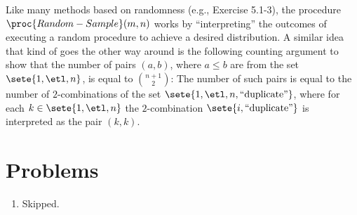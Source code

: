 \begin{enumerate}[\thesection-1]
\begin{remark}
Like many methods based on randomness (e.g., Exercise 5.1-3), the procedure $\proc{Random-Sample}(m, n)$ works by ``interpreting'' the outcomes of executing a random procedure to achieve a desired distribution. A similar idea that kind of goes the other way around is the following counting argument to show that the number of pairs $(a, b)$, where $a \leq b$ are from the set $\sete{1, \etl, n}$, is equal to ${n + 1 \choose 2}$: The number of such pairs is equal to the number of $2$-combinations of the set $\sete{1, \etl, n, \mbox{``duplicate''}}$, where for each $k \in \sete{1, \etl, n}$ the $2$-combination $\sete{i, \mbox{``duplicate''}}$ is interpreted as the pair $(k, k)$.
\end{remark}
%
\end{enumerate}

\section*{Problems}
\begin{enumerate}[\thechapter-1]
%
\item Skipped.
%
\end{enumerate}